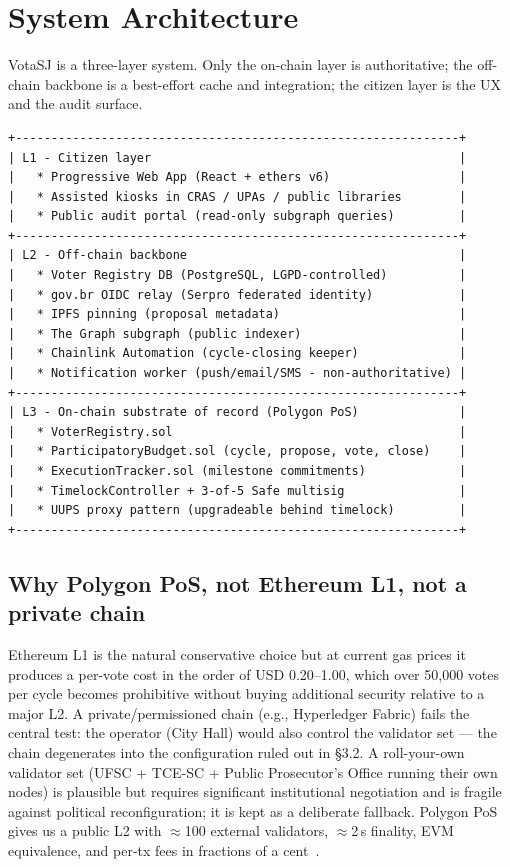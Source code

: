 \documentclass[12pt]{article}
\begin{document}
\section{System Architecture}
\label{sec:arch}

VotaSJ is a three-layer system. Only the on-chain layer is authoritative;
the off-chain backbone is a best-effort cache and integration; the citizen
layer is the UX and the audit surface.

\begin{lstlisting}[caption={High-level architecture}]
+--------------------------------------------------------------+
| L1 - Citizen layer                                           |
|   * Progressive Web App (React + ethers v6)                  |
|   * Assisted kiosks in CRAS / UPAs / public libraries        |
|   * Public audit portal (read-only subgraph queries)         |
+--------------------------------------------------------------+
| L2 - Off-chain backbone                                      |
|   * Voter Registry DB (PostgreSQL, LGPD-controlled)          |
|   * gov.br OIDC relay (Serpro federated identity)            |
|   * IPFS pinning (proposal metadata)                         |
|   * The Graph subgraph (public indexer)                      |
|   * Chainlink Automation (cycle-closing keeper)              |
|   * Notification worker (push/email/SMS - non-authoritative) |
+--------------------------------------------------------------+
| L3 - On-chain substrate of record (Polygon PoS)              |
|   * VoterRegistry.sol                                        |
|   * ParticipatoryBudget.sol (cycle, propose, vote, close)    |
|   * ExecutionTracker.sol (milestone commitments)             |
|   * TimelockController + 3-of-5 Safe multisig                |
|   * UUPS proxy pattern (upgradeable behind timelock)         |
+--------------------------------------------------------------+
\end{lstlisting}

\subsection{Why Polygon PoS, not Ethereum L1, not a private chain}

Ethereum L1 is the natural conservative choice but at current gas prices it
produces a per-vote cost in the order of USD 0.20--1.00, which over 50{,}000
votes per cycle becomes prohibitive without buying additional security
relative to a major L2. A private/permissioned chain (e.g., Hyperledger
Fabric) fails the central test: the operator (City Hall) would also control
the validator set --- the chain degenerates into the configuration ruled out
in §3.2. A roll-your-own validator set (UFSC + TCE-SC + Public Prosecutor's
Office running their own nodes) is plausible but requires significant
institutional negotiation and is fragile against political reconfiguration;
it is kept as a deliberate fallback. Polygon PoS gives us a public L2
with \(\approx\)100 external validators, \(\approx\)2\,s finality, EVM
equivalence, and per-tx fees in fractions of a cent~\cite{polygondocs}.
\end{document}

